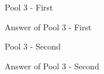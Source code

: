 \begin{question}
Pool 3 - First
\end{question}
\begin{solution}
Answer of Pool 3 - First
\end{solution}

\begin{question}
Pool 3 - Second
\end{question}
\begin{solution}
Answer of Pool 3 - Second
\end{solution}
